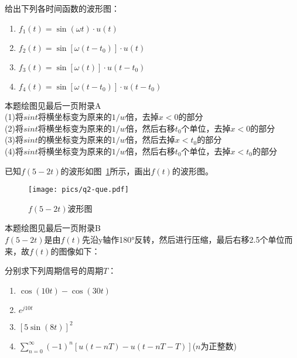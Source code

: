 \documentclass[answers]{exam}
\begin{document}
\Large

\begin{questions}

\question 给出下列各时间函数的波形图：
\begin{enumerate}[(1)]
	\item $f_1(t) = \sin(\omega t) \cdot u(t)$
	\item $f_2(t) = \sin\left[ \omega (t-t_0) \right] \cdot u(t)$
	\item $f_3(t) = \sin\left[ \omega (t) \right] \cdot u(t-t_0)$
	\item $f_4(t) = \sin\left[ \omega (t-t_0) \right] \cdot u(t-t_0)$
\end{enumerate}

\begin{solution}
	{\color{red} 本题绘图见最后一页附录A}\\
	(1)将$sint$将横坐标变为原来的$1/w$倍，去掉$x<0$的部分\\

	(2)将$sint$将横坐标变为原来的$1/w$倍，然后右移$t_0$个单位，去掉$x<0$的部分\\

	(3)将$sint$的横坐标变为原来的$1/w$倍，然后去掉$x<t_0$的部分\\

	(4)将$sint$将横坐标变为原来的$1/w$倍，然后右移$t_0$个单位，去掉$x<t_0$的部分\\
\end{solution}



\question 已知$f(5-2t)$的波形如图~\ref{fig:q2-1}所示，画出$f(t)$的波形图。
\begin{figure}
	\centering
	\texttt{[image: pics/q2-que.pdf]}
	\caption{$f(5-2t)$波形图} \label{fig:q2-1}
\end{figure}

\begin{solution}
	{\color{red} 本题绘图见最后一页附录B}\\
	$f(5-2t)$是由$f(t)$先沿y轴作180°反转，然后进行压缩，最后右移2.5个单位而来，故$f(t)$的图像如下：

\end{solution}



\question 分别求下列周期信号的周期$T$：
\begin{enumerate}[(1)]
	\item $\cos(10t)-\cos(30t)$
	\item $e^{j10t}$
	\item $\left[5 \sin(8t) \right]^2$
	\item $\sum_{n=0}^{\infty} (-1)^n \left[ u(t-nT) - u(t-nT-T) \right]$($n$为正整数)
\end{enumerate}


\end{questions}
\end{document}
